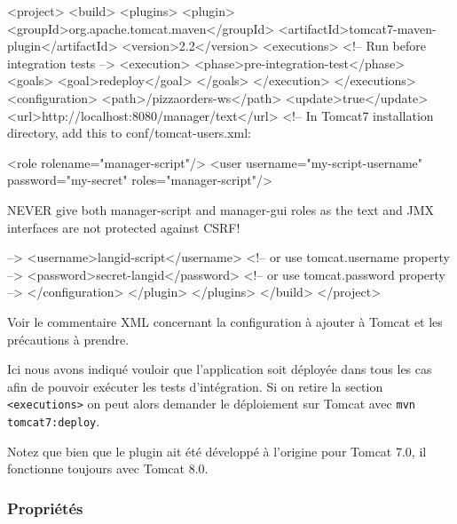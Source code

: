 \begin{xmlcode}
<project>
    <build>
        <plugins>
            <plugin>
                <groupId>org.apache.tomcat.maven</groupId>
                <artifactId>tomcat7-maven-plugin</artifactId>
                <version>2.2</version>
                <executions>
                    <!-- Run before integration tests -->
                    <execution>
                        <phase>pre-integration-test</phase>
                        <goals>
                            <goal>redeploy</goal>
                        </goals>
                    </execution>
                </executions>
                <configuration>
                    <path>/pizzaorders-ws</path>
                    <update>true</update>
                    <url>http://localhost:8080/manager/text</url>
                    <!--
                    In Tomcat7 installation directory, add this to conf/tomcat-users.xml:

                    <role rolename="manager-script"/>
                    <user username="my-script-username" 
                          password="my-secret" 
                             roles="manager-script"/>

                    NEVER give both manager-script and manager-gui roles 
                    as the text and JMX interfaces
                    are not protected against CSRF!

                    -->
                    <username>langid-script</username>
                    <!-- or use tomcat.username property -->
                    <password>secret-langid</password>
                    <!-- or use tomcat.password property -->
                </configuration>
            </plugin>
        </plugins>
    </build>
</project>
\end{xmlcode}

Voir le commentaire XML concernant la configuration à ajouter à Tomcat et les précautions à prendre.

Ici nous avons indiqué vouloir que l'application soit déployée dans tous les cas
afin de pouvoir exécuter les tests d'intégration. Si on retire la section \verb|<executions>|
on peut alors demander le déploiement sur Tomcat avec \verb|mvn tomcat7:deploy|.

Notez que bien que le plugin ait été développé à l'origine pour Tomcat 7.0, il fonctionne toujours avec Tomcat 8.0.

\subsubsection{Propriétés}

